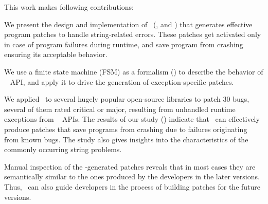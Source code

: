 This work makes following contributions:
\begin{mylist}
\item We present the design and implementation of \tool\
(,  and ) that
 generates effective program patches to handle string-related errors. These 
patches get activated only in case of program failures during runtime, and save
program from crashing ensuring its acceptable behavior.



\item We use a finite state machine (FSM) as a formalism () to
describe the behavior of \java\ \code{String} API, and apply it to drive the
generation of exception-specific patches.

\item We applied \tool\ to several hugely popular open-source libraries to patch
$30$ bugs, several of them rated critical or major, resulting from unhandled
runtime exceptions from \java\ \code{String} APIs. The results of our study
(\xref{sec:results}) indicate that \tool\ can effectively produce patches that
save programs from crashing due to failures originating from known bugs. The
study also gives insights into the characteristics of the commonly occurring
string problems.

\item Manual inspection of the \tool-generated patches reveals that in most
cases they are semantically similar to the ones produced by the developers in
the later versions. %
Thus, \tool\ can also guide developers in the process of building patches for
the future versions.
\end{mylist}


